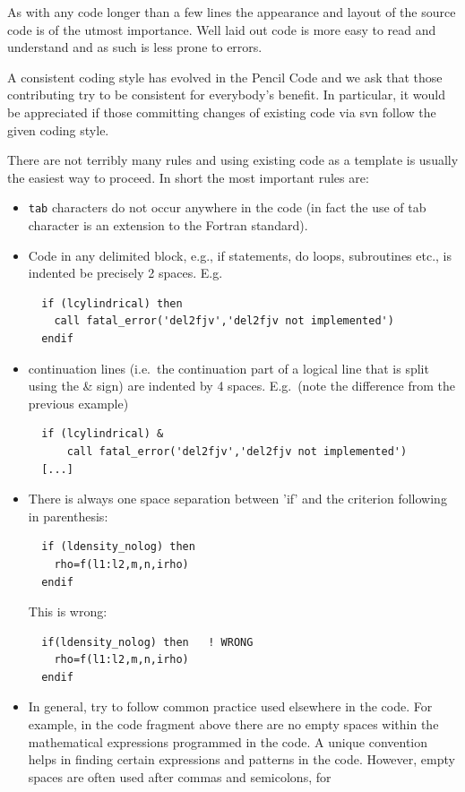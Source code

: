 \documentclass[\mydriver,12pt,twoside,notitlepage,a4paper]{article}
\makeatletter
\newcommand{\code}[1]{\texttt{#1}}
\newcommand{\cmd}{\command}
\newcommand{\command}[2][]{%
  \def\index@{#1}%
  \code{#2}%
  \ifx\index@\@empty\index{#2@\emph{#2}}%
  \else\index{#1@\emph{#1}}%
  \fi%
}
\makeatother
\begin{document}
As with any code longer than a few lines the appearance and layout
of the source code is of the utmost importance.  Well laid out
code is more easy to read and understand and as such is less prone
to errors.

A consistent coding style has evolved in the {\sc Pencil Code} and we
ask that those contributing try to be consistent for everybody's
benefit.  In particular, it would be appreciated if those committing
changes of existing code via svn follow the given coding style.

There are not terribly many rules and using existing code as a template
is usually the easiest way to proceed.  In short the most important rules are:
\begin{itemize}
\item \cmd{tab} characters do not occur anywhere in the code (in fact the use of
tab character is an extension to the Fortran standard).
\item Code in any delimited block, e.g., if statements, do loops, subroutines
etc., is indented be precisely 2 spaces.
E.g.
\begin{Verbatim}
  if (lcylindrical) then
    call fatal_error('del2fjv','del2fjv not implemented')
  endif
\end{Verbatim}
\item continuation lines (i.e.~the continuation part of a logical line
  that is split using the \& sign) are indented by 4 spaces.
  E.g.~(note the difference from the previous example)
\begin{Verbatim}
  if (lcylindrical) &
      call fatal_error('del2fjv','del2fjv not implemented')
  [...]
\end{Verbatim}
\item There is always one space separation between 'if' and the criterion
following in parenthesis:
\begin{verbatim}
  if (ldensity_nolog) then
    rho=f(l1:l2,m,n,irho)
  endif
\end{verbatim}
This is wrong:
\begin{verbatim}
  if(ldensity_nolog) then   ! WRONG
    rho=f(l1:l2,m,n,irho)
  endif
\end{verbatim}
\item
In general, try to follow common practice used elsewhere in the code.
For example, in the code fragment above there are no empty spaces within
the mathematical expressions programmed in the code.
A unique convention helps in finding certain expressions and patterns
in the code.
However, empty spaces are often used after commas and semicolons, for

\end{itemize}
\end{document}
